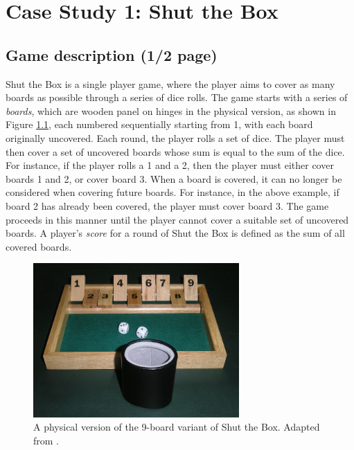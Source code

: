 \chapter{Case Study 1: Shut the Box}
\label{cs1}

\section{Game description (1/2 page)}
\label{cs1:stb_description}



Shut the Box is a single player game, where the player aims to cover as many boards as possible through a series of dice rolls. The game starts with a series of \emph{boards}, which are wooden panel on hinges in the physical version, as shown in Figure \ref{cs1:physical_stb}, each numbered sequentially starting from 1, with each board originally uncovered. Each round, the player rolls a set of dice. The player must then cover a set of uncovered boards whose sum is equal to the sum of the dice. For instance, if the player rolls a 1 and a 2, then the player must either cover boards 1 and 2, or cover board 3. When a board is covered, it can no longer be considered when covering future boards. For instance, in the above example, if board 2 has already been covered, the player must cover board 3. The game proceeds in this manner until the player cannot cover a suitable set of uncovered boards. A player's \emph{score} for a round of Shut the Box is defined as the sum of all covered boards.

\begin{figure}[h]
    \centering
    \includegraphics[width=0.7\textwidth]{images/shut_the_box.jpg}
    \caption{A physical version of the 9-board variant of Shut the Box. Adapted from \cite{wikipedia_deutsch_2006}.}
    \label{cs1:physical_stb}
\end{figure}

